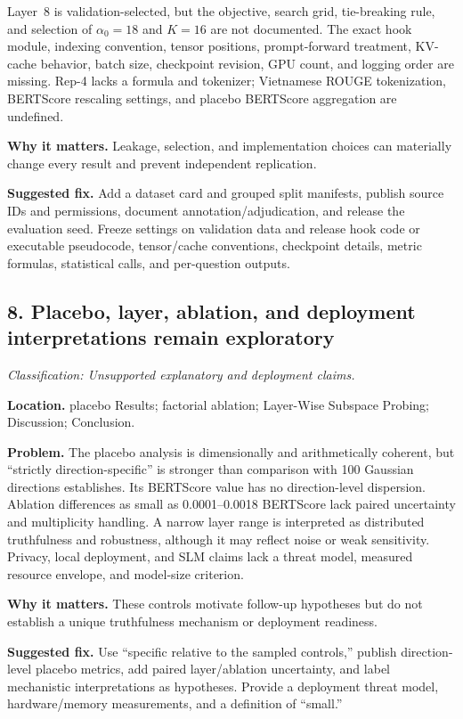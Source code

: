 \documentclass[11pt]{article}
\newcommand{\findinglabel}[1]{\textbf{#1}}
\newcommand{\classification}[1]{\textit{Classification: #1.}}
\begin{document}
Layer~8 is validation-selected, but the objective, search grid, tie-breaking rule, and selection of $\alpha_0=18$ and $K=16$ are not documented.  The exact hook module, indexing convention, tensor positions, prompt-forward treatment, KV-cache behavior, batch size, checkpoint revision, GPU count, and logging order are missing.  Rep-4 lacks a formula and tokenizer; Vietnamese ROUGE tokenization, BERTScore rescaling settings, and placebo BERTScore aggregation are undefined.

\findinglabel{Why it matters.} Leakage, selection, and implementation choices can materially change every result and prevent independent replication.

\findinglabel{Suggested fix.} Add a dataset card and grouped split manifests, publish source IDs and permissions, document annotation/adjudication, and release the evaluation seed.  Freeze settings on validation data and release hook code or executable pseudocode, tensor/cache conventions, checkpoint details, metric formulas, statistical calls, and per-question outputs.

\subsection*{8. Placebo, layer, ablation, and deployment interpretations remain exploratory}

\classification{Unsupported explanatory and deployment claims}

\findinglabel{Location.} placebo Results; factorial ablation; Layer-Wise Subspace Probing; Discussion; Conclusion.

\findinglabel{Problem.} The placebo analysis is dimensionally and arithmetically coherent, but ``strictly direction-specific'' is stronger than comparison with 100 Gaussian directions establishes.  Its BERTScore value has no direction-level dispersion.  Ablation differences as small as 0.0001--0.0018 BERTScore lack paired uncertainty and multiplicity handling.  A narrow layer range is interpreted as distributed truthfulness and robustness, although it may reflect noise or weak sensitivity.  Privacy, local deployment, and SLM claims lack a threat model, measured resource envelope, and model-size criterion.

\findinglabel{Why it matters.} These controls motivate follow-up hypotheses but do not establish a unique truthfulness mechanism or deployment readiness.

\findinglabel{Suggested fix.} Use ``specific relative to the sampled controls,'' publish direction-level placebo metrics, add paired layer/ablation uncertainty, and label mechanistic interpretations as hypotheses.  Provide a deployment threat model, hardware/memory measurements, and a definition of ``small.''
\end{document}
